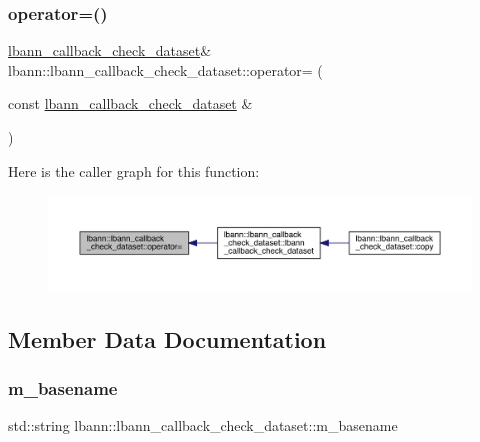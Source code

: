 \subsubsection{\texorpdfstring{operator=()}{operator=()}}
{\footnotesize\ttfamily \hyperlink{classlbann_1_1lbann__callback__check__dataset}{lbann\+\_\+callback\+\_\+check\+\_\+dataset}\& lbann\+::lbann\+\_\+callback\+\_\+check\+\_\+dataset\+::operator= (\begin{DoxyParamCaption}\item[{const \hyperlink{classlbann_1_1lbann__callback__check__dataset}{lbann\+\_\+callback\+\_\+check\+\_\+dataset} \&}]{ }\end{DoxyParamCaption})\hspace{0.3cm}{\ttfamily [default]}}

Here is the caller graph for this function\+:\nopagebreak
\begin{figure}[H]
\begin{center}
\leavevmode
\includegraphics[width=350pt]{classlbann_1_1lbann__callback__check__dataset_a2b9ab1194196d9edc76eb89bc81257b8_icgraph}
\end{center}
\end{figure}


\subsection{Member Data Documentation}
\mbox{\label{classlbann_1_1lbann__callback__check__dataset_afb8f8ae1ddbd07bf816ee9e8fa84ca8f}} 
\subsubsection{\texorpdfstring{m\+\_\+basename}{m\_basename}}
{\footnotesize\ttfamily std\+::string lbann\+::lbann\+\_\+callback\+\_\+check\+\_\+dataset\+::m\+\_\+basename\hspace{0.3cm}{\ttfamily [private]}}

